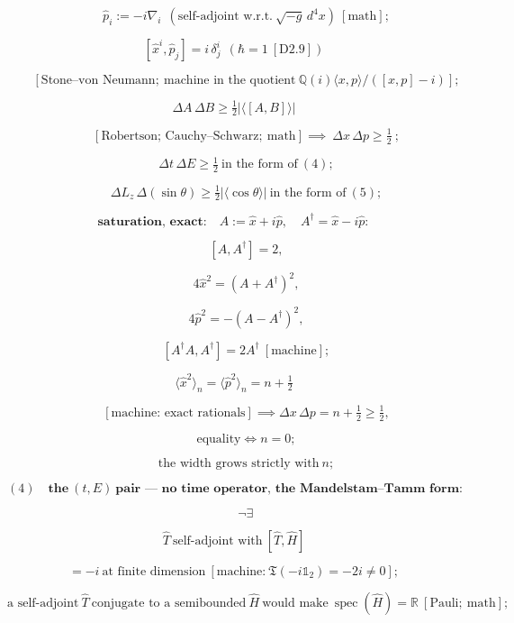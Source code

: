\documentclass[11pt,openany]{report}
\theoremstyle{canonplain}
\theoremstyle{canondef}
\begin{document}
\[
\qquad \hat p_i:=-i\nabla_i\ \ (\text{self-adjoint w.r.t.}\ \sqrt{-g}\,d^4x)\ [\text{math}];
\]

\[
[\hat x^i,\hat p_j]=i\,\delta^i_j\ \ (\hbar=1\ [\mathrm{D2.9}])
\]

\[
\qquad [\text{Stone–von Neumann};\ \text{machine in the quotient}\ \mathbb Q(i)\langle x,p\rangle/([x,p]-i)];
\]

\[
\Delta A\,\Delta B\ge\tfrac12\bigl|\langle[A,B]\rangle\bigr|
\]

\[
\qquad [\text{Robertson; Cauchy–Schwarz};\ \text{math}]\implies\boxed{\ \Delta x\,\Delta p\ge\tfrac12\ };
\]

\[
\qquad \Delta t\,\Delta E\ge\tfrac12\ \text{in the form of}\ (4);
\]

\[
\qquad \Delta L_z\,\Delta(\sin\theta)\ge\tfrac12|\langle\cos\theta\rangle|\ \text{in the form of}\ (5);
\]

\[
\textbf{saturation, exact:}\quad A:=\hat x+i\hat p,\quad A^\dagger=\hat x-i\hat p:
\]

\[
\qquad [A,A^\dagger]=2,
\]

\[
\qquad 4\hat x^2=(A+A^\dagger)^2,
\]

\[
\qquad 4\hat p^2=-(A-A^\dagger)^2,
\]

\[
\qquad [A^\dagger A,A^\dagger]=2A^\dagger\ [\text{machine}];
\]

\[
\langle\hat x^2\rangle_n=\langle\hat p^2\rangle_n=n+\tfrac12
\]

\[
\qquad [\text{machine: exact rationals}]\implies\Delta x\,\Delta p=n+\tfrac12\ge\tfrac12,
\]

\[
\qquad \text{equality}\iff n=0;
\]

\[
\qquad \text{the width grows strictly with}\ n;
\]

\[
(4)\quad\textbf{the}\ (t,E)\ \textbf{pair — no time operator, the Mandelstam–Tamm form:}
\]

\[
\qquad \neg\exists\,
\]

\[
\hat T\ \text{self-adjoint with}\ [\hat T,\hat H]
\]

\[
= -i\ \text{at finite dimension}\ [\text{machine:}\ \mathfrak T(-i\mathbb1_2)=-2i\ne0];
\]

\[
\text{a self-adjoint}\ \hat T\ \text{conjugate to a semibounded}\ \hat H\ \text{would make}\ \operatorname{spec}(\hat H)=\mathbb R\ [\text{Pauli};\ \text{math}];
\]
\end{document}
